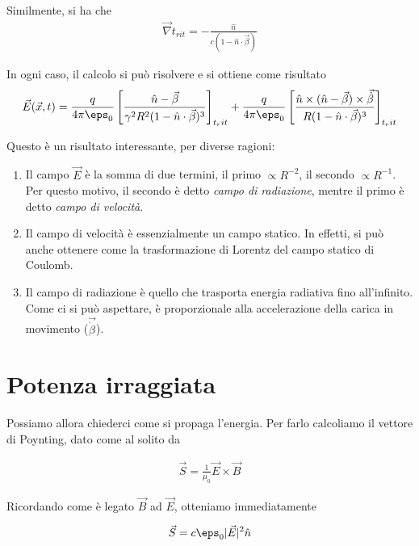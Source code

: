 \documentclass{report}
\begin{document}
Similmente, si ha che 
\begin{align}
    \vec{\nabla}t_{rit} = -\frac{\hat{n}}{c(1-\hat{n}\cdot \vec{\beta})}
\end{align}

In ogni caso, il calcolo si può risolvere e si ottiene come risultato 
\begin{align}
    \vec{E}(\vec{x}, t) = \frac{q}{4\pi \eps_0}\left[\frac{\hat{n}-\vec{\beta}}{\gamma^2R^2(1-\hat{n}\cdot\vec{\beta})^3}\right]_{t_rit} + \frac{q}{4\pi \eps_0}\left[\frac{\hat{n}\times(\hat{n} - \vec{\beta})\times\vec{\dot{\beta}}}{R(1-\hat{n}\cdot\vec{\beta})^3}\right]_{t_rit}
\end{align}

Questo è un risultato interessante, per diverse ragioni: 

\begin{enumerate}
    \item Il campo \(\vec{E}\) è la somma di due termini, il primo \(\propto R^{-2}\), il secondo \(\propto R^{-1}\). Per questo motivo, il secondo è detto \emph{campo di radiazione}, mentre il primo è detto \emph{campo di velocità}. 
    \item Il campo di velocità è essenzialmente un campo statico. In effetti, si può anche ottenere come la trasformazione di Lorentz del campo statico di Coulomb. \\
    \item Il campo di radiazione è quello che trasporta energia radiativa fino all'infinito. Come ci si può aspettare, è proporzionale alla accelerazione della carica in movimento (\(\vec{\dot{\beta}}\)). 
\end{enumerate}

\section{Potenza irraggiata}

Possiamo allora chiederci come si propaga l'energia. Per farlo calcoliamo il vettore di Poynting, dato come al solito da 

\begin{align}
    \vec{S} = \frac{1}{\mu_0}\vec{E}\times\vec{B}
\end{align}

Ricordando come è legato \(\vec{B}\) ad \(\vec{E}\), otteniamo immediatamente 

\begin{align}
    \vec{S} = c\eps_0 |\vec{E}|^2\hat{n}
\end{align}
\end{document}
